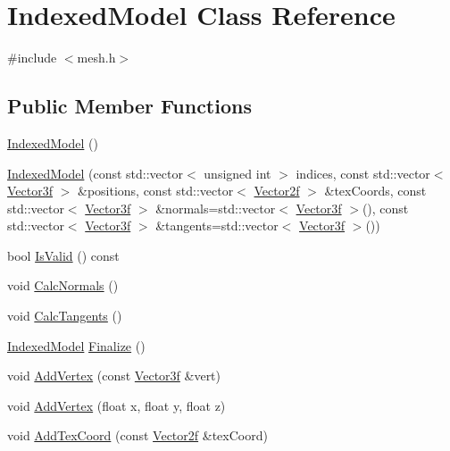 \hypertarget{class_indexed_model}{}\section{Indexed\+Model Class Reference}
\label{class_indexed_model}


{\ttfamily \#include $<$mesh.\+h$>$}

\subsection*{Public Member Functions}
\begin{DoxyCompactItemize}
\item 
\hyperlink{class_indexed_model_a1e547725f750214d5d4478ae5dda27fd}{Indexed\+Model} ()
\item 
\hyperlink{class_indexed_model_ad3927c4cd998510c27b6d78d453eed8c}{Indexed\+Model} (const std\+::vector$<$ unsigned int $>$ indices, const std\+::vector$<$ \hyperlink{class_vector3f}{Vector3f} $>$ \&positions, const std\+::vector$<$ \hyperlink{math3d_8h_a9f3739462b0605dcb64299fa289b6afe}{Vector2f} $>$ \&tex\+Coords, const std\+::vector$<$ \hyperlink{class_vector3f}{Vector3f} $>$ \&normals=std\+::vector$<$ \hyperlink{class_vector3f}{Vector3f} $>$(), const std\+::vector$<$ \hyperlink{class_vector3f}{Vector3f} $>$ \&tangents=std\+::vector$<$ \hyperlink{class_vector3f}{Vector3f} $>$())
\item 
bool \hyperlink{class_indexed_model_adbca8c4691184cfaff137d228ddd885c}{Is\+Valid} () const 
\item 
void \hyperlink{class_indexed_model_ad7c6f8680a079108e64d463b34dca802}{Calc\+Normals} ()
\item 
void \hyperlink{class_indexed_model_a5d9194a38c4c18cf5159d7fe5dbd1e14}{Calc\+Tangents} ()
\item 
\hyperlink{class_indexed_model}{Indexed\+Model} \hyperlink{class_indexed_model_a8f39e2fa52afdcfc5637487a37625a36}{Finalize} ()
\item 
void \hyperlink{class_indexed_model_a12ffb5465a583451ae594741a7151503}{Add\+Vertex} (const \hyperlink{class_vector3f}{Vector3f} \&vert)
\item 
void \hyperlink{class_indexed_model_af9e4cf11a7382e12d0d190f68f2a0549}{Add\+Vertex} (float x, float y, float z)
\item 
void \hyperlink{class_indexed_model_a8e64a560d6421b5208426e82bca89bc2}{Add\+Tex\+Coord} (const \hyperlink{math3d_8h_a9f3739462b0605dcb64299fa289b6afe}{Vector2f} \&tex\+Coord)

\end{DoxyCompactItemize}
